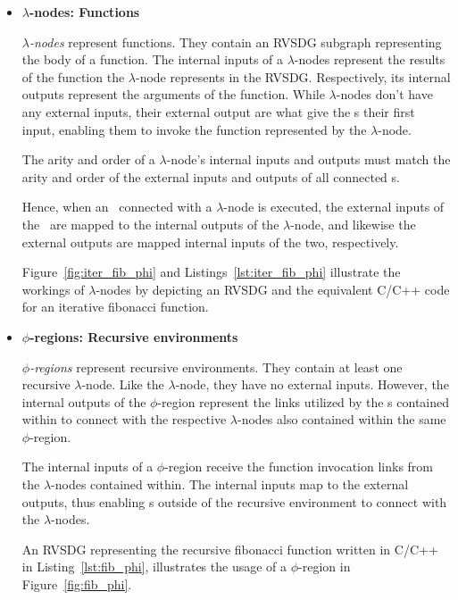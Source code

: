 \begin{itemize}
\item \textbf{$\lambda$-nodes: Functions}

\textit{$\lambda$-nodes} represent functions. They contain an RVSDG subgraph
representing the body of a function. The internal inputs of a $\lambda$-nodes
represent the results of the function the $\lambda$-node represents in the
RVSDG. Respectively, its internal outputs represent the arguments of the
function. While $\lambda$-nodes don't have any external inputs, their external
output are what give the \applyNode s their first input, enabling them to invoke
the function represented by the $\lambda$-node.

The arity and order of a $\lambda$-node's internal inputs and outputs must match
the arity and order of the external inputs and outputs of all connected
\applyNode s.

Hence, when an \applyNode~connected with a $\lambda$-node is executed, the
external inputs of the \applyNode~are mapped to the internal outputs of the
$\lambda$-node, and likewise the external outputs are mapped internal inputs of
the two, respectively.

Figure~\ref{fig:iter_fib_phi} and Listings~\ref{lst:iter_fib_phi} illustrate the
workings of $\lambda$-nodes by depicting an RVSDG and the equivalent C/C++ code
for an iterative fibonacci function.


\item \textbf{$\phi$-regions: Recursive environments}

\textit{$\phi$-regions} represent recursive environments. They contain at least
one recursive $\lambda$-node. Like the $\lambda$-node, they have no external
inputs. However, the internal outputs of the $\phi$-region represent the links
utilized by the \applyNode s contained within to connect with the respective
$\lambda$-nodes also contained within the same $\phi$-region.

The internal inputs of a $\phi$-region receive the function invocation links
from the $\lambda$-nodes contained within. The internal inputs map to the
external outputs, thus enabling \applyNode s outside of the recursive
environment to connect with the $\lambda$-nodes.

An RVSDG representing the recursive fibonacci function written in C/C++ in
Listing~\ref{lst:fib_phi}, illustrates the usage of a $\phi$-region in
Figure~\ref{fig:fib_phi}.


\end{itemize}
